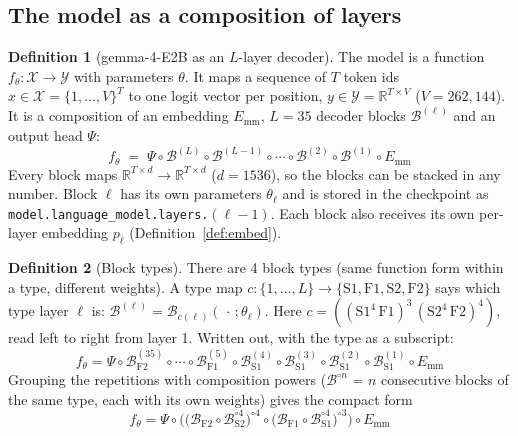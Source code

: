 \documentclass[10pt,a4paper]{article}
\theoremstyle{definition}
\newtheorem{definition}{Definition}[section]
\begin{document}
\subsection{The model as a composition of layers}\label{sec:comp}
\begin{definition}[gemma-4-E2B as an $L$-layer decoder]
The model is a function $f_\theta:\mathcal{X}\to\mathcal{Y}$ with parameters $\theta$. It maps a sequence of $T$ token ids $x\in\mathcal{X}=\{1,\dots,V\}^{T}$ to one logit vector per position, $y\in\mathcal{Y}=\mathbb{R}^{T\times V}$ ($V=262{,}144$). It is a composition of an embedding $E_{\mathrm{mm}}$, $L=35$ decoder blocks $\mathcal{B}^{(\ell)}$ and an output head $\Psi$:
\begin{equation}
  f_\theta \;=\; \Psi\circ\mathcal{B}^{(L)}\circ\mathcal{B}^{(L-1)}\circ\cdots\circ\mathcal{B}^{(2)}\circ\mathcal{B}^{(1)}\circ E_{\mathrm{mm}}
\end{equation}
Every block maps $\mathbb{R}^{T\times d}\to\mathbb{R}^{T\times d}$ ($d=1536$), so the blocks can be stacked in any number. Block $\ell$ has its own parameters $\theta_\ell$ and is stored in the checkpoint as \texttt{model.language\_model.layers.}$(\ell-1)$. Each block also receives its own per-layer embedding $p_\ell$ (Definition~\ref{def:embed}).
\end{definition}
\begin{definition}[Block types]
There are 4 block types (same function form within a type, different weights). A type map $c:\{1,\dots,L\}\to\{\mathrm{S1},\mathrm{F1},\mathrm{S2},\mathrm{F2}\}$ says which type layer $\ell$ is: $\mathcal{B}^{(\ell)}=\mathcal{B}_{c(\ell)}(\,\cdot\,;\theta_\ell)$. Here $c=((\mathrm{S1}^{4}\,\mathrm{F1})^{3}\,(\mathrm{S2}^{4}\,\mathrm{F2})^{4})$, read left to right from layer 1.
Written out, with the type as a subscript:
\begin{equation}
  f_\theta = \Psi\circ \mathcal{B}^{(35)}_{\mathrm{F2}}\circ \cdots\circ \mathcal{B}^{(5)}_{\mathrm{F1}}\circ \mathcal{B}^{(4)}_{\mathrm{S1}}\circ \mathcal{B}^{(3)}_{\mathrm{S1}}\circ \mathcal{B}^{(2)}_{\mathrm{S1}}\circ \mathcal{B}^{(1)}_{\mathrm{S1}}\circ E_{\mathrm{mm}}
\end{equation}
Grouping the repetitions with composition powers ($\mathcal{B}^{\circ n}$ = $n$ consecutive blocks of the same type, each with its own weights) gives the compact form
\begin{equation}\label{eq:compact}
  f_\theta = \Psi\circ\Big(\big(\mathcal{B}_{\mathrm{F2}} \circ \mathcal{B}_{\mathrm{S2}}^{\circ 4}\big)^{\circ 4} \circ \big(\mathcal{B}_{\mathrm{F1}} \circ \mathcal{B}_{\mathrm{S1}}^{\circ 4}\big)^{\circ 3}\Big)\circ E_{\mathrm{mm}}
\end{equation}
\end{definition}
\end{document}
